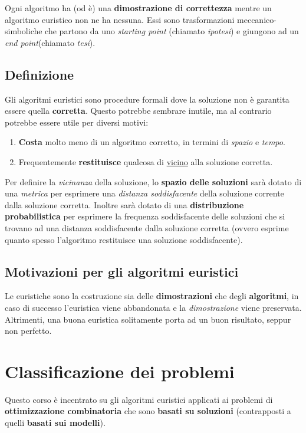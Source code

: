 \documentclass{article}
\begin{document}
Ogni algoritmo ha (od è) una \textbf{dimostrazione di correttezza} mentre un algoritmo euristico non ne ha nessuna.
Essi sono trasformazioni meccanico-simboliche che partono da uno \textit{starting point} (chiamato \textit{ipotesi}) e giungono ad un \textit{end point}(chiamato \textit{tesi}).

\subsection{Definizione}
Gli algoritmi euristici sono procedure formali dove la soluzione non è garantita essere quella \textbf{corretta}. Questo potrebbe sembrare inutile,
ma al contrario potrebbe essere utile per diversi motivi:
\begin{enumerate}
    \item \textbf{Costa} molto meno di un algoritmo corretto, in termini di \textit{spazio} e \textit{tempo}.
    \item Frequentemente \textbf{restituisce} qualcosa di \underline{vicino} alla soluzione corretta.
\end{enumerate}

Per definire la \textit{vicinanza} della soluzione, lo \textbf{spazio delle soluzioni} sarà dotato di una \textit{metrica} per esprimere una \textit{distanza soddisfacente}
della soluzione corrente dalla soluzione corretta.
Inoltre sarà dotato di una \textbf{distribuzione probabilistica} per esprimere la frequenza soddisfacente delle soluzioni che si trovano ad una distanza soddisfacente dalla
soluzione corretta (ovvero esprime quanto spesso l'algoritmo restituisce una soluzione soddisfacente).

\subsection{Motivazioni per gli algoritmi euristici}
Le euristiche sono la costruzione sia delle \textbf{dimostrazioni} che degli \textbf{algoritmi}, in caso di successo l'euristica viene abbandonata e la
\textit{dimostrazione} viene preservata. Altrimenti, una buona euristica solitamente porta ad un buon risultato, seppur non perfetto.
\section{Classificazione dei problemi}
Questo corso è incentrato su gli algoritmi euristici applicati ai problemi di \textbf{ottimizzazione combinatoria} che sono \textbf{basati su soluzioni}
(contrapposti a quelli \textbf{basati sui modelli}).
\end{document}
